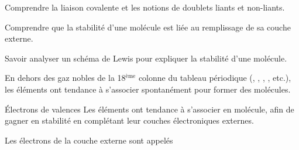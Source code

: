 \teteSndMole
{}

\begin{objectifs}
  \item Comprendre la liaison covalente et les notions de doublets liants et non-liants.
  \item Comprendre que la stabilité d'une molécule est liée au remplissage de sa couche externe.
  \item Savoir analyser un schéma de Lewis pour expliquer la stabilité d'une molécule.
\end{objectifs}

\begin{contexte}
  En dehors des gaz nobles de la 18$^\text{ème}$ colonne du tableau périodique (, , , , etc.), les éléments ont tendance à s'associer spontanément pour former des molécules. 
  
\end{contexte}



\begin{doc}{Électrons de valences}
  Les éléments ont tendance à s'associer en molécule, afin de gagner en stabilité en complétant leur couches électroniques externes.
  
  \begin{importants}  
    Les électrons de la couche externe sont appelés 
  \end{importants}  
\end{doc}
  
